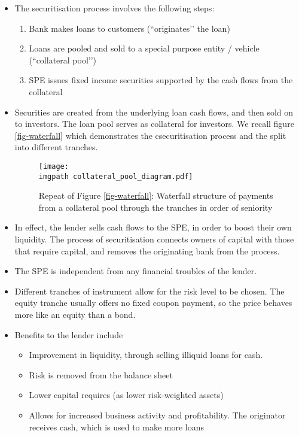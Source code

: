 \documentclass[../notes_compiled.tex]{subfiles}
\begin{document}
\begin{itemize}
\item The securitisation process involves the following steps:
\begin{enumerate}
\item Bank makes loans to customers (``originates’’ the loan)
\item Loans are pooled and sold to a special purpose entity / vehicle (``collateral pool’’)
\item SPE issues fixed income securities supported by the cash flows from the collateral
\end{enumerate}

\item Securities are created from the underlying loan cash flows, and then sold on to investors. The loan pool serves as collateral for investors. We recall figure \ref{fig-waterfall} which demonstrates the csecuritisation process and the split into different tranches.

\begin{figure}[h]
  \centering
  \texttt{[image: \\imgpath collateral\_pool\_diagram.pdf]}
  \caption*{Repeat of Figure \ref{fig-waterfall}: Waterfall structure of payments from a collateral pool through the tranches in order of seniority}
\end{figure}

\item In effect, the lender sells cash flows to the SPE, in order to boost their own liquidity. The process of securitisation connects owners of capital with those that require capital, and removes the originating bank from the process.
\item The SPE is independent from any financial troubles of the lender.
\item Different tranches of instrument allow for the risk level to be chosen. The equity tranche usually offers no fixed coupon payment, so the price behaves more like an equity than a bond.

\item Benefits to the lender include
\begin{itemize}
\item Improvement in liquidity, through selling illiquid loans for cash.
\item Risk is removed from the balance sheet
\item Lower capital requires (as lower risk-weighted assets)
\item Allows for increased business activity and profitability. The originator receives cash, which is used to make more loans
\end{itemize}


\end{itemize}
\end{document}
